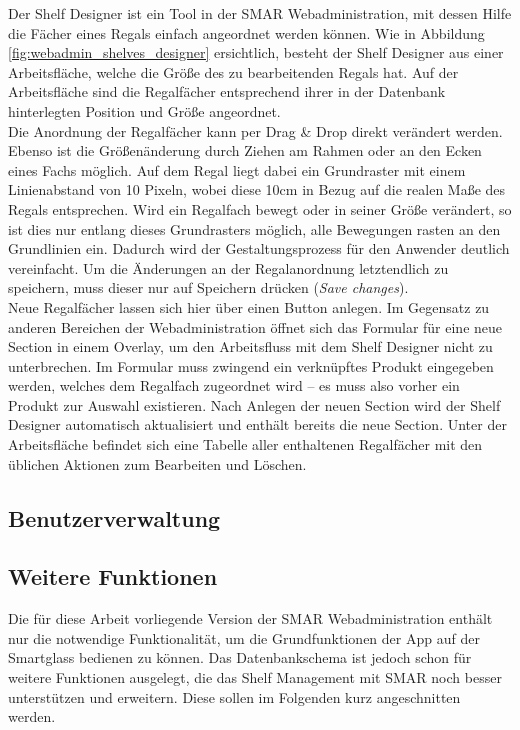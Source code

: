 Der Shelf Designer ist ein Tool in der \acs{SMAR} Webadministration, mit dessen Hilfe die Fächer eines Regals einfach angeordnet werden können. Wie in Abbildung \ref{fig:webadmin_shelves_designer} ersichtlich, besteht der Shelf Designer aus einer Arbeitsfläche, welche die Größe des zu bearbeitenden Regals hat. Auf der Arbeitsfläche sind die Regalfächer entsprechend ihrer in der Datenbank hinterlegten Position und Größe angeordnet.\\

Die Anordnung der Regalfächer kann per Drag \& Drop direkt verändert werden. Ebenso ist die Größenänderung durch Ziehen am Rahmen oder an den Ecken eines Fachs möglich. Auf dem Regal liegt dabei ein Grundraster mit einem Linienabstand von 10 Pixeln, wobei diese 10cm in Bezug auf die realen Maße des Regals entsprechen. Wird ein Regalfach bewegt oder in seiner Größe verändert, so ist dies nur entlang dieses Grundrasters möglich, alle Bewegungen rasten an den Grundlinien ein. Dadurch wird der Gestaltungsprozess für den Anwender deutlich vereinfacht. Um die Änderungen an der Regalanordnung letztendlich zu speichern, muss dieser nur auf Speichern drücken (\emph{Save changes}).\\

Neue Regalfächer lassen sich hier über einen Button anlegen. Im Gegensatz zu anderen Bereichen der Webadministration öffnet sich das Formular für eine neue  Section in einem Overlay, um den Arbeitsfluss mit dem Shelf Designer nicht zu unterbrechen. Im Formular muss zwingend ein verknüpftes Produkt eingegeben werden, welches dem Regalfach zugeordnet wird -- es muss also vorher ein Produkt zur Auswahl existieren. Nach Anlegen der neuen Section wird der Shelf Designer automatisch aktualisiert und enthält bereits die neue Section. Unter der Arbeitsfläche befindet sich eine Tabelle aller enthaltenen Regalfächer mit den üblichen Aktionen zum Bearbeiten und Löschen.\\


\subsection{Benutzerverwaltung}


\subsection{Weitere Funktionen}

Die für diese Arbeit vorliegende Version der \acs{SMAR} Webadministration enthält nur die notwendige Funktionalität, um die Grundfunktionen der App auf der Smartglass bedienen zu können. Das Datenbankschema ist jedoch schon für weitere Funktionen ausgelegt, die das Shelf Management mit \acs{SMAR} noch besser unterstützen und erweitern. Diese sollen im Folgenden kurz angeschnitten werden.

